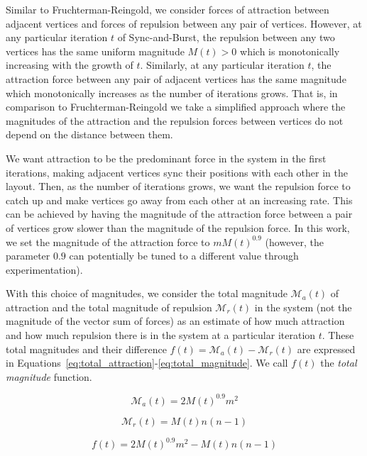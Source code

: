 \documentclass{llncs}
\begin{document}
Similar to Fruchterman-Reingold, we consider forces of attraction between adjacent vertices and forces of repulsion between any pair of vertices. However, at any particular iteration $t$ of Sync-and-Burst, the repulsion between any two vertices has the same uniform magnitude $M(t) > 0$ which is monotonically increasing with the growth of $t$. Similarly, at any particular iteration $t$, the attraction force between any pair of adjacent vertices has the same magnitude which monotonically increases as the number of iterations grows. That is, in comparison to Fruchterman-Reingold we take a simplified approach where the magnitudes of the attraction and the repulsion forces between vertices do not depend on the distance between them.

We want attraction to be the predominant force in the system in the first iterations, making adjacent vertices sync their positions with each other in the layout. Then, as the number of iterations grows, we want the repulsion force to catch up and make vertices go away from each other at an increasing rate. This can be achieved by having the magnitude of the attraction force between a pair of vertices grow slower than the magnitude of the repulsion force. In this work, we set the magnitude of the attraction force to $mM(t)^{0.9}$ (however, the parameter $0.9$ can potentially be tuned to a different value through experimentation).

With this choice of magnitudes, we consider the total magnitude $\mathcal{M}_a(t)$ of attraction and the total magnitude of repulsion $\mathcal{M}_r(t)$ in the system (not the magnitude of the vector sum of forces) as an estimate of how much attraction and how much repulsion there is in the system at a particular iteration $t$. These total magnitudes and their difference $f(t) =  \mathcal{M}_a(t) - \mathcal{M}_r(t)$ are expressed in Equations~\eqref{eq:total_attraction}-\eqref{eq:total_magnitude}. We call $f(t)$ the \emph{total magnitude} function.

\begin{equation}
\label{eq:total_attraction}
\mathcal{M}_a(t) = 2M(t)^{0.9}m^2
\end{equation}

\begin{equation}
\label{eq:total_repulsion}
\mathcal{M}_r(t) = M(t)n(n-1)
\end{equation}

\begin{equation}
\label{eq:total_magnitude}
f(t) = 2M(t)^{0.9}m^2  - M(t)n(n-1)
\end{equation}
\end{document}
